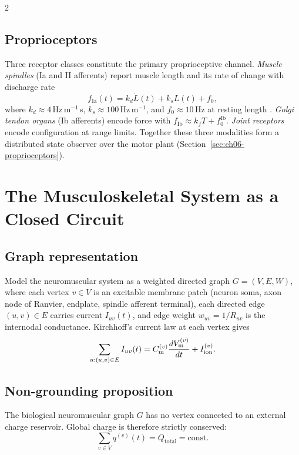 \begin{multicols}{2}
\subsection{Proprioceptors}

Three receptor classes constitute the primary proprioceptive channel.
\emph{Muscle spindles} (Ia and II afferents) report muscle length and its rate
of change with discharge rate
\begin{equation}
  f_{\mathrm{Ia}}(t) = k_d\dot{L}(t) + k_s L(t) + f_0,
  \label{eq:ch06-spindle}
\end{equation}
where $k_d \approx 4$\,Hz\,m$^{-1}$\,s, $k_s \approx 100$\,Hz\,m$^{-1}$,
and $f_0 \approx 10$\,Hz at resting length
\citep{matthews1972,prochazka1989}.  \emph{Golgi tendon organs} (Ib afferents)
encode force with $f_{\mathrm{Ib}} \approx k_f T + f_0^{\mathrm{Ib}}$.
\emph{Joint receptors} encode configuration at range limits.  Together these
three modalities form a distributed state observer over the motor plant
(Section~\ref{sec:ch06-proprioceptors}).

\section{The Musculoskeletal System as a Closed Circuit}
\label{sec:ch06-circuit}

\subsection{Graph representation}

Model the neuromuscular system as a weighted directed graph
$G = (V, E, W)$, where each vertex $v \in V$ is an excitable membrane patch
(neuron soma, axon node of Ranvier, endplate, spindle afferent terminal), each
directed edge $(u,v) \in E$ carries current $I_{uv}(t)$, and edge weight
$w_{uv} = 1/R_{uv}$ is the internodal conductance.  Kirchhoff's current law
at each vertex gives
\begin{equation}
  \sum_{u:(u,v)\in E} I_{uv}(t)
  = C_{\mathrm{m}}^{(v)}\frac{dV_{\mathrm{m}}^{(v)}}{dt} + I_{\mathrm{ion}}^{(v)}.
  \label{eq:ch06-kcl}
\end{equation}

\subsection{Non-grounding proposition}

\begin{proposition}
\label{prop:ch06-noground}
The biological neuromuscular graph $G$ has no vertex connected to an external
charge reservoir.  Global charge is therefore strictly conserved:
\begin{equation}
  \sum_{v\in V} q^{(v)}(t) = Q_{\mathrm{total}} = \mathrm{const.}
  \label{eq:ch06-conservation}
\end{equation}
\end{proposition}


\end{multicols}
